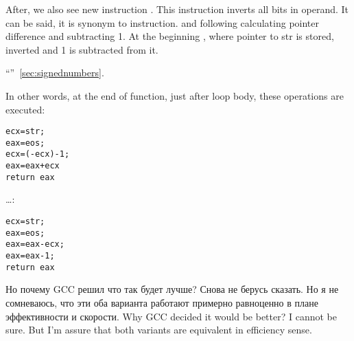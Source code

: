{After, we also see new instruction \NOT. This instruction inverts all bits in operand. 
It can be said, it is synonym to  instruction. 
\NOT and following \ADD calculating pointer difference and subtracting 1. 
At the beginning \ECX, where pointer to str is stored, inverted and 1 is subtracted from it.}

 ``\SignedNumbersSectionName''~\ref{sec:signednumbers}.

{In other words, at the end of function, just after loop body, these operations are executed:}

\begin{lstlisting}
ecx=str;
eax=eos;
ecx=(-ecx)-1; 
eax=eax+ecx
return eax
\end{lstlisting}

\dots {}:

\begin{lstlisting}
ecx=str;
eax=eos;
eax=eax-ecx;
eax=eax-1;
return eax
\end{lstlisting}

\IFRU
{Но почему GCC решил что так будет лучше? Снова не берусь сказать. Но я не сомневаюсь, 
что эти оба варианта работают примерно равноценно в плане эффективности и скорости.}
{Why GCC decided it would be better? I cannot be sure. 
But I'm assure that both variants are equivalent in efficiency sense.}
